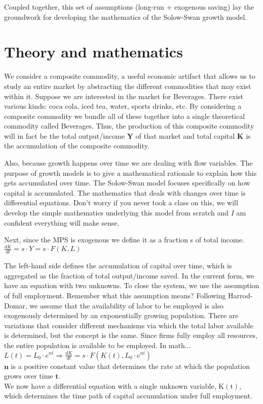 \documentclass[10pt]{article}
\begin{document}
Coupled together, this set of assumptions (long-run + exogenous saving) lay the groundwork for developing the mathematics of the Solow-Swan growth model.

\section*{Theory and mathematics}
We consider a composite commodity, a useful economic artifact that allows us to study an entire market by abstracting the different commodities that may exist within it. Suppose we are interested in the market for Beverages. There exist various kinds: coca cola, iced tea, water, sports drinks, etc. By considering a composite commodity we bundle all of these together into a single theoretical commodity called Beverages. Thus, the production of this composite commodity will in fact be the total output/income $\mathbf{Y}$ of that market and total capital $\mathbf{K}$ is the accumulation of the composite commodity.

Also, because growth happens over time we are dealing with flow variables. The purpose of growth models is to give a mathematical rationale to explain how this gets accumulated over time. The Solow-Swan model focuses specifically on how capital is accumulated. The mathematics that deals with changes over time is differential equations. Don't worry if you never took a class on this, we will develop the simple mathematics underlying this model from scratch and $I$ am confident everything will make sense.

Next, since the MPS is exogenous we define it as a fraction s of total income.\\
$\frac{d K}{d t}=s \cdot Y=s \cdot F(K, L)$

The left-hand side defines the accumulation of capital over time, which is aggregated as the fraction of total output/income saved. In the current form, we have an equation with two unknowns. To close the system, we use the assumption of full employment. Remember what this assumption means? Following Harrod-Domar, we assume that the availability of labor to be employed is also exogenously determined by an exponentially growing population. There are variations that consider different mechanisms via which the total labor available is determined, but the concept is the same. Since firms fully employ all resources, the entire population is available to be employed. In math...\\
$L(t)=L_{0} \cdot e^{n t} \Rightarrow \frac{d K}{d t}=s \cdot F\left(K(t), L_{0} \cdot e^{n t}\right)$\\
$\mathbf{n}$ is a positive constant value that determines the rate at which the population grows over time $\mathbf{t}$.\\
We now have a differential equation with a single unknown variable, $\mathrm{K}(\mathrm{t})$, which determines the time path of capital accumulation under full employment.
\end{document}
